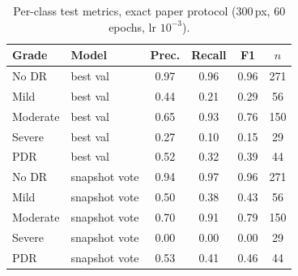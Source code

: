 \begin{table}[t]
\centering
\caption{Per-class test metrics, exact paper protocol (300\,px, 60 epochs, lr $10^{-3}$).}
\label{tab:perclass}
\footnotesize
\begin{tabular}{llcccc}
\toprule
Grade & Model & Prec. & Recall & F1 & $n$ \\
\midrule
No DR & best val & 0.97 & 0.96 & 0.96 & 271 \\
Mild & best val & 0.44 & 0.21 & 0.29 & 56 \\
Moderate & best val & 0.65 & 0.93 & 0.76 & 150 \\
Severe & best val & 0.27 & 0.10 & 0.15 & 29 \\
PDR & best val & 0.52 & 0.32 & 0.39 & 44 \\
\midrule
No DR & snapshot vote & 0.94 & 0.97 & 0.96 & 271 \\
Mild & snapshot vote & 0.50 & 0.38 & 0.43 & 56 \\
Moderate & snapshot vote & 0.70 & 0.91 & 0.79 & 150 \\
Severe & snapshot vote & 0.00 & 0.00 & 0.00 & 29 \\
PDR & snapshot vote & 0.53 & 0.41 & 0.46 & 44 \\
\bottomrule
\end{tabular}
\end{table}

